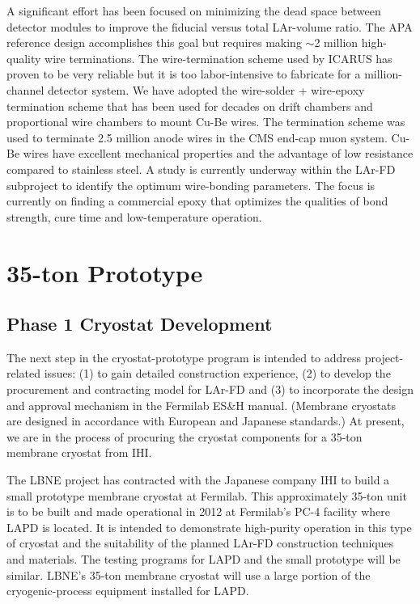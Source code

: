 A significant effort has been focused on minimizing the dead space between detector modules to improve
the fiducial versus total LAr-volume ratio. The APA reference design accomplishes this goal but requires making $\sim$2 million high-quality wire terminations. The wire-termination scheme used by ICARUS has proven to be very reliable but it is too labor-intensive to fabricate for a million-channel detector system. We have adopted the wire-solder + wire-epoxy termination scheme that has been used for decades on drift chambers and proportional wire chambers to mount Cu-Be wires. The termination scheme was used to terminate 2.5 million  anode wires in the CMS end-cap muon system. Cu-Be wires have excellent mechanical properties and the advantage of low resistance compared to stainless steel. A study is currently underway within the LAr-FD subproject to identify the optimum wire-bonding parameters. The focus is currently on finding a commercial epoxy that optimizes the qualities of bond strength, cure time and low-temperature operation.

\section{35-ton Prototype}

\subsection{Phase 1 Cryostat Development}
\label{35tonprototype}


The next step in the cryostat-prototype program is intended to address project-related issues: (1) to gain detailed construction experience, (2) to develop the procurement and contracting model for LAr-FD and (3) to incorporate the design and approval mechanism in the Fermilab ES\&H manual. (Membrane cryostats are designed in accordance with European and Japanese standards.) At present, we are in the process of procuring the cryostat components for a 35-ton membrane cryostat from IHI.

The LBNE project has contracted with the Japanese company IHI to build a small prototype membrane cryostat at Fermilab.  This approximately 35-ton unit is to be built and made operational in 2012 at Fermilab's PC-4 facility where LAPD is located.  It is intended to demonstrate high-purity operation in this type of cryostat and the suitability of the planned LAr-FD construction techniques and materials.  The testing programs for LAPD and the small prototype will be similar.  LBNE's 35-ton membrane cryostat will use a large portion of the cryogenic-process equipment installed for LAPD.


